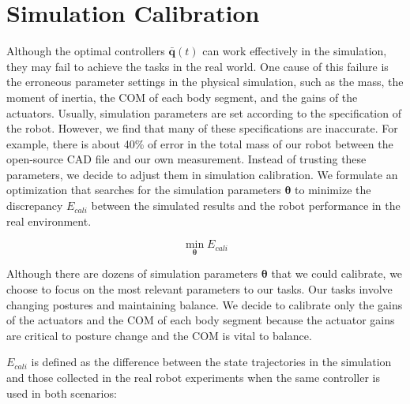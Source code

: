 \section{Simulation Calibration}
Although the optimal controllers $\bar{\mathbf{q}}(t)$ can work effectively in the simulation, they may fail to achieve the tasks in the real world. One cause of this failure is the erroneous parameter settings in the physical simulation, such as the mass, the moment of inertia, the COM of each body segment, and the gains of the actuators. Usually, simulation parameters are set according to the specification of the robot. However, we find that many of these specifications are inaccurate. For example, there is about 40\% of error in the total mass of our robot between the open-source CAD file and our own measurement. Instead of trusting these parameters, we decide to adjust them in simulation calibration. We formulate an optimization that searches for the simulation parameters $\boldsymbol{\theta}$ to minimize the discrepancy $E_{cali}$ between the simulated results and the robot performance in the real environment.

\begin{equation}
 \min_{\boldsymbol{\theta}} E_{cali}
\label{eqn:calibration}
\end{equation}

Although there are dozens of simulation parameters $\boldsymbol{\theta}$ that we could calibrate, we choose to focus on the most relevant parameters to our tasks. Our tasks involve changing postures and maintaining balance. We decide to calibrate only the gains of the actuators and the COM of each body segment because the actuator gains are critical to posture change and the COM is vital to balance.

$E_{cali}$ is defined as the difference between the state trajectories in the simulation and those collected in the real robot experiments when the same controller is used in both scenarios:

